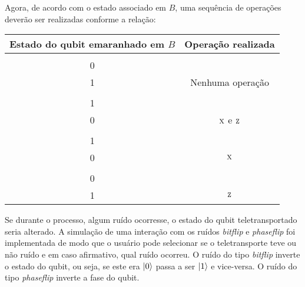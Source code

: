 Agora, de acordo com o estado associado em \(B\), uma sequência de operações deverão ser realizadas conforme a relação:
\begin{center}
  \begin{tabular}{cc}
    \toprule
    Estado do qubit emaranhado em \(B\) & Operação realizada \\
    \midrule
    \(\alpha \begin{bmatrix} 1 \\ 0 \end{bmatrix} + \beta \begin{bmatrix} 0 \\ 1 \end{bmatrix}\) & Nenhuma operação \\
    \(\alpha \begin{bmatrix} 0 \\ 1 \end{bmatrix} - \beta \begin{bmatrix} 1 \\ 0 \end{bmatrix}\) & \(\operatorname{\textsc{x}}\) e \(\operatorname{\textsc{z}}\) \\
    \(\alpha \begin{bmatrix} 0 \\ 1 \end{bmatrix} + \beta \begin{bmatrix} 1 \\ 0 \end{bmatrix}\) & \(\operatorname{\textsc{x}}\) \\
    \(\alpha \begin{bmatrix} 1 \\ 0 \end{bmatrix} - \beta \begin{bmatrix} 0 \\ 1 \end{bmatrix}\) & \(\operatorname{\textsc{z}}\) \\
    \bottomrule
  \end{tabular}
\end{center}

Se durante o processo, algum ruído ocorresse, o estado do qubit teletransportado seria alterado. A simulação de uma interação com os ruídos \emph{bitflip} e \emph{phaseflip} foi implementada de modo que o usuário pode selecionar se o teletransporte teve ou não ruído e em caso afirmativo, qual ruído ocorreu. O ruído do tipo \emph{bitflip} inverte o estado do qubit, ou seja, se este era \(\ket{0}\) passa a ser \(\ket{1}\) e vice-versa. O ruído do tipo \emph{phaseflip} inverte a fase do qubit.

